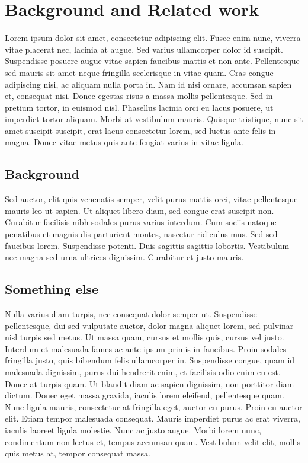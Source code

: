 \chapter{Background and Related work}
\label{chp:relatedwork}

Lorem ipsum dolor sit amet, consectetur adipiscing elit. Fusce enim nunc,
viverra vitae placerat nec, lacinia at augue. Sed varius ullamcorper dolor
id suscipit. Suspendisse posuere augue vitae sapien faucibus mattis et non
ante. Pellentesque sed mauris sit amet neque fringilla scelerisque in vitae
quam. Cras congue adipiscing nisi, ac aliquam nulla porta in. Nam id nisi
ornare, accumsan sapien et, consequat nisi. Donec egestas risus a massa
mollis pellentesque. Sed in pretium tortor, in euismod nisl. Phasellus
lacinia orci eu lacus posuere, ut imperdiet tortor aliquam. Morbi at
vestibulum mauris. Quisque tristique, nunc sit amet suscipit suscipit, erat
lacus consectetur lorem, sed luctus ante felis in magna. Donec vitae metus
quis ante feugiat varius in vitae ligula.

\section{Background}
Sed auctor, elit quis venenatis semper, velit purus mattis orci, vitae
pellentesque mauris leo ut sapien. Ut aliquet libero diam, sed congue erat
suscipit non. Curabitur facilisis nibh sodales purus varius interdum. Cum
sociis natoque penatibus et magnis dis parturient montes, nascetur ridiculus
mus. Sed sed faucibus lorem. Suspendisse potenti. Duis sagittis sagittis
lobortis. Vestibulum nec magna sed urna ultrices dignissim. Curabitur et
justo mauris.

\section{Something else}
Nulla varius diam turpis, nec consequat dolor semper ut. Suspendisse
pellentesque, dui sed vulputate auctor, dolor magna aliquet lorem, sed
pulvinar nisl turpis sed metus. Ut massa quam, cursus et mollis quis, cursus
vel justo. Interdum et malesuada fames ac ante ipsum primis in faucibus.
Proin sodales fringilla justo, quis bibendum felis ullamcorper in.
Suspendisse congue, quam id malesuada dignissim, purus dui hendrerit enim,
et facilisis odio enim eu est. Donec at turpis quam. Ut blandit diam ac
sapien dignissim, non porttitor diam dictum. Donec eget massa gravida,
iaculis lorem eleifend, pellentesque quam. Nunc ligula mauris, consectetur
at fringilla eget, auctor eu purus. Proin eu auctor elit. Etiam tempor
malesuada consequat. Mauris imperdiet purus ac erat viverra, iaculis laoreet
ligula molestie. Nunc ac justo augue. Morbi lorem nunc, condimentum non
lectus et, tempus accumsan quam. Vestibulum velit elit, mollis quis metus
at, tempor consequat massa.


